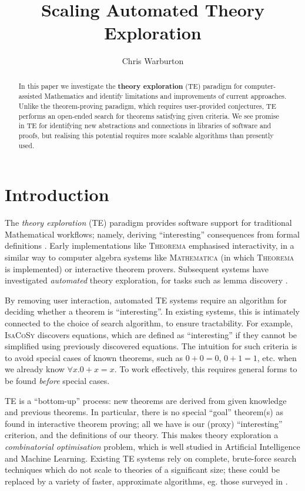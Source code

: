 \documentclass[]{article}
\title{Scaling Automated Theory Exploration}
\author{Chris Warburton}
\date{}
\begin{document}
\maketitle

\begin{abstract}

In this paper we investigate the \textbf{theory exploration} (TE)
paradigm for computer-assisted Mathematics and identify limitations and
improvements of current approaches. Unlike the theorem-proving paradigm,
which requires user-provided conjectures, TE performs an open-ended
search for theorems satisfying given criteria. We see promise in TE for
identifying new abstractions and connections in libraries of software
and proofs, but realising this potential requires more scalable
algorithms than presently used.

\end{abstract}

\section{Introduction}\label{introduction}

The \emph{theory exploration} (TE) paradigm provides software support
for traditional Mathematical workflows; namely, deriving ``interesting''
consequences from formal definitions \cite{RISC1482}. Early
implementations like \textsc{Theorema} \cite{buchberger2000theory} emphasised
interactivity, in a similar way to computer algebra systems like
\textsc{Mathematica} (in which \textsc{Theorema} is implemented) or
interactive theorem provers. Subsequent systems have investigated
\emph{automated} theory exploration, for tasks such as lemma discovery
\cite{Hipster}.

By removing user interaction, automated TE systems require an algorithm
for deciding whether a theorem is ``interesting''. In existing systems,
this is intimately connected to the choice of search algorithm, to
ensure tractability. For example, \textsc{IsaCoSy} \cite{johansson2009isacosy}
discovers equations, which are defined as
``interesting'' if they cannot be simplified using previously discovered
equations. The intuition for such criteria is to avoid special cases of
known theorems, such as \(0 + 0 = 0\), \(0 + 1 = 1\), etc. when we
already know \(\forall x. 0 + x = x\). To work effectively, this
requires general forms to be found \emph{before} special cases.

TE is a ``bottom-up'' process: new theorems are derived from given
knowledge and previous theorems. In particular, there is no special
``goal'' theorem(s) as found in interactive theorem proving; all we have
is our (proxy) ``interesting'' criterion, and the definitions of our
theory. This makes theory exploration a \emph{combinatorial
optimisation} problem, which is well studied in Artificial Intelligence
and Machine Learning. Existing TE systems rely on complete, brute-force
search techniques which do not scale to theories of a significant size;
these could be replaced by a variety of faster, approximate algorithms,
eg. those surveyed in \cite{blum2011hybrid}.
\end{document}
